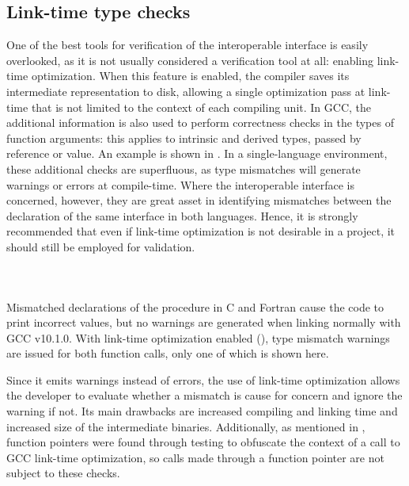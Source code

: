 \subsection*{Link-time type checks}

One of the best tools for verification of the interoperable interface is easily overlooked, as it is not usually considered a verification tool at all: enabling link-time optimization. When this feature is enabled, the compiler saves its intermediate representation to disk, allowing a single optimization pass at link-time that is not limited to the context of each compiling unit. In GCC, the additional information is also used to perform correctness checks in the types of function arguments: this applies to intrinsic and derived types, passed by reference or value. An example is shown in . In a single-language environment, these additional checks are superfluous, as type mismatches will generate warnings or errors at compile-time. Where the interoperable interface is concerned, however, they are great asset in identifying mismatches between the declaration of the same interface in both languages. Hence, it is strongly recommended that even if link-time optimization is not desirable in a project, it should still be employed for validation.

\begin{listing}
    \inputminted{Fortran}{src/misc/lto_warnings/fsrc.f90}
    \inputminted{C}{src/misc/lto_warnings/csrc.c}
    \inputminted[fontsize=\small]{text}{src/misc/lto_warnings/output.txt}
    \caption{Mismatched declarations of the procedure in C and Fortran cause the code to print incorrect values, but no warnings are generated when linking normally with GCC v10.1.0. With link-time optimization enabled (), type mismatch warnings are issued for both function calls, only one of which is shown here.}
    \label{src:lto_warnings}
\end{listing} 

Since it emits warnings instead of errors, the use of link-time optimization allows the developer to evaluate whether a mismatch is cause for concern and ignore the warning if not. Its main drawbacks are increased compiling and linking time and increased size of the intermediate binaries. Additionally, as mentioned in , function pointers were found through testing to obfuscate the context of a call to GCC link-time optimization, so calls made through a function pointer are not subject to these checks.

